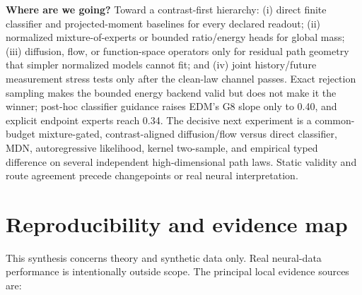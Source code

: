\documentclass[10pt]{article}
\begin{document}
\textbf{Where are we going?}  Toward a contrast-first hierarchy: (i) direct
finite classifier and projected-moment baselines for every declared readout;
(ii) normalized mixture-of-experts or bounded ratio/energy heads for global mass;
(iii) diffusion, flow, or function-space operators only for residual path geometry
that simpler normalized models cannot fit; and (iv) joint history/future
measurement stress tests only after the clean-law channel passes.  Exact rejection
sampling makes the bounded energy backend valid but does not make it the winner;
post-hoc classifier guidance raises EDM's G8 slope only to 0.40, and explicit
endpoint experts reach 0.34.  The decisive next experiment is a common-budget
mixture-gated, contrast-aligned diffusion/flow versus direct
classifier, MDN, autoregressive likelihood, kernel two-sample, and empirical typed
difference on several independent high-dimensional path laws.  Static validity
and route agreement precede changepoints or real neural interpretation.

\appendix

\section{Reproducibility and evidence map}

This synthesis concerns theory and synthetic data only. Real neural-data performance is intentionally outside scope. The principal local evidence sources are:
\end{document}
